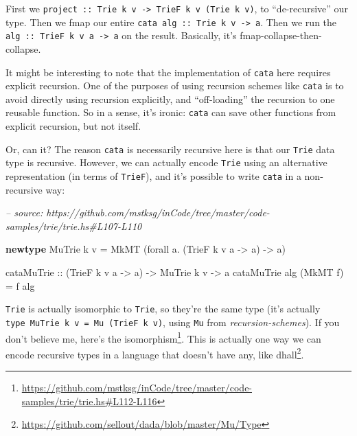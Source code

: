 \documentclass[]{article}
\newenvironment{Shaded}{}{}
\newcommand{\CommentTok}[1]{\textcolor[rgb]{0.38,0.63,0.69}{\textit{#1}}}
\newcommand{\DataTypeTok}[1]{\textcolor[rgb]{0.56,0.13,0.00}{#1}}
\newcommand{\FunctionTok}[1]{\textcolor[rgb]{0.02,0.16,0.49}{#1}}
\newcommand{\KeywordTok}[1]{\textcolor[rgb]{0.00,0.44,0.13}{\textbf{#1}}}
\newcommand{\NormalTok}[1]{#1}
\newcommand{\OtherTok}[1]{\textcolor[rgb]{0.00,0.44,0.13}{#1}}
\renewcommand{\href}[2]{#2\footnote{\url{#1}}}
\begin{document}
First we
\texttt{project\ ::\ Trie\ k\ v\ -\textgreater{}\ TrieF\ k\ v\ (Trie\ k\ v)}, to
``de-recursive'' our type. Then we fmap our entire
\texttt{cata\ alg\ ::\ Trie\ k\ v\ -\textgreater{}\ a}. Then we run the
\texttt{alg\ ::\ TrieF\ k\ v\ a\ -\textgreater{}\ a} on the result. Basically,
it's fmap-collapse-then-collapse.

It might be interesting to note that the implementation of
\texttt{cata\textquotesingle{}} here requires explicit recursion. One of the
purposes of using recursion schemes like \texttt{cata} is to avoid directly
using recursion explicitly, and ``off-loading'' the recursion to one reusable
function. So in a sense, it's ironic: \texttt{cata} can save other functions
from explicit recursion, but not itself.

Or, can it? The reason \texttt{cata\textquotesingle{}} is necessarily recursive
here is that our \texttt{Trie} data type is recursive. However, we can actually
encode \texttt{Trie} using an alternative representation (in terms of
\texttt{TrieF}), and it's possible to write \texttt{cata\textquotesingle{}} in a
non-recursive way:

\begin{Shaded}
\begin{Highlighting}[]
\CommentTok{-- source: https://github.com/mstksg/inCode/tree/master/code-samples/trie/trie.hs#L107-L110}

\KeywordTok{newtype} \DataTypeTok{MuTrie}\NormalTok{ k v }\FunctionTok{=} \DataTypeTok{MkMT}\NormalTok{ (forall a}\FunctionTok{.}\NormalTok{ (}\DataTypeTok{TrieF}\NormalTok{ k v a }\OtherTok{->}\NormalTok{ a) }\OtherTok{->}\NormalTok{ a)}

\OtherTok{cataMuTrie ::}\NormalTok{ (}\DataTypeTok{TrieF}\NormalTok{ k v a }\OtherTok{->}\NormalTok{ a) }\OtherTok{->} \DataTypeTok{MuTrie}\NormalTok{ k v }\OtherTok{->}\NormalTok{ a}
\NormalTok{cataMuTrie alg (}\DataTypeTok{MkMT}\NormalTok{ f) }\FunctionTok{=}\NormalTok{ f alg}
\end{Highlighting}
\end{Shaded}

\texttt{Trie\textquotesingle{}} is actually isomorphic to \texttt{Trie}, so
they're the same type (it's actually
\texttt{type\ MuTrie\ k\ v\ =\ Mu\ (TrieF\ k\ v)}, using \texttt{Mu} from
\emph{recursion-schemes}). If you don't believe me,
\href{https://github.com/mstksg/inCode/tree/master/code-samples/trie/trie.hs\#L112-L116}{here's
the isomorphism}. This is actually one way we can encode recursive types in a
language that doesn't have any, like
\href{https://github.com/sellout/dada/blob/master/Mu/Type}{dhall}.
\end{document}
